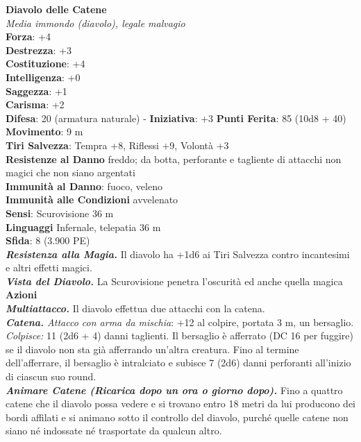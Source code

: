 \begin{multicols}{2}
\medskip\textbf{Diavolo delle Catene}\\
\emph{Media immondo (diavolo), legale malvagio}\\
\textbf{Forza}: +4\\
\textbf{Destrezza}: +3\\
\textbf{Costituzione}: +4\\
\textbf{Intelligenza}: +0\\
\textbf{Saggezza}: +1\\
\textbf{Carisma}: +2\\
\textbf{Difesa}: 20 (armatura naturale) - \textbf{Iniziativa}: +3
\textbf{Punti Ferita}: 85 (10d8 + 40)\\
\textbf{Movimento}: 9 m\\
\textbf{Tiri Salvezza}: Tempra +8, Riflessi +9, Volontà +3\\
\textbf{Resistenze al Danno} freddo; da botta, perforante e tagliente di attacchi non magici che non siano argentati\\
\textbf{Immunità al Danno}: fuoco, veleno\\
\textbf{Immunità alle Condizioni} avvelenato\\
\textbf{Sensi}: Scurovisione 36 m\\
\textbf{Linguaggi} Infernale, telepatia 36 m \\
\textbf{Sfida}: 8 (3.900 PE)\smallskip\\
\emph{\textbf{Resistenza alla Magia.}} Il diavolo ha +1d6 ai Tiri Salvezza contro incantesimi e altri effetti magici.\\
\emph{\textbf{Vista del Diavolo.}} La Scurovisione penetra l'oscurità ed anche quella magica\\
\smallskip\textbf{Azioni}\\
\emph{\textbf{Multiattacco.}} Il diavolo effettua due attacchi con la catena.\\
\emph{\textbf{Catena.} Attacco con arma da mischia}: +12 al colpire, portata 3 m, un bersaglio.\\
\emph{Colpisce:} 11 (2d6 + 4) danni taglienti. Il bersaglio è afferrato (DC  16 per fuggire) se il diavolo non sta già afferrando un'altra creatura. Fino al termine dell'afferrare, il bersaglio è intralciato e subisce 7 (2d6) danni perforanti all'inizio di ciascun suo round.\\
\emph{\textbf{Animare Catene (Ricarica dopo un ora o giorno dopo).}} Fino a quattro catene che il diavolo possa vedere e si trovano entro 18 metri da lui producono dei bordi affilati e si animano sotto il controllo del diavolo, purché quelle catene non siano né indossate né trasportate da qualcun altro.\\

\end{multicols}
